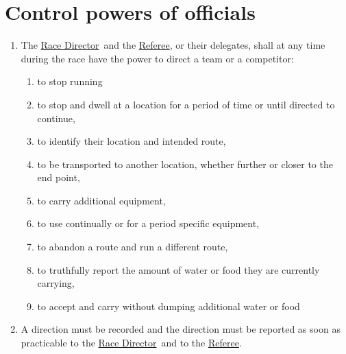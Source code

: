 \documentclass[12pt]{report}
\newcommand{\hyplink}[1]{\hyperlink{#1}{{#1}}}
\newcommand{\RaceDirector}{\hyplink{Race Director}}
\newcommand{\Referee}{\hyplink{Referee}}
\begin{document}
    \section{Control powers of officials}
  \begin{enumerate}
    \item The \RaceDirector\  and the \Referee, or their delegates, shall at any time during the race have the power to direct a team or a competitor:
    \begin{enumerate}
      \item to stop running
      \item to stop and dwell at a location for a period of time or until directed to continue,
      \item to identify their location and intended route,
      \item to be transported to another location, whether further or closer to the end point,
      \item to carry additional equipment,
      \item to use continually or for a period specific equipment,
      \item to abandon a route and run a different route,
      \item to truthfully report the amount of water or food they are currently carrying,
      \item to accept and carry without dumping additional water or food
    \end{enumerate}
    \item A direction must be recorded and the direction must be reported as soon as practicable to the  \RaceDirector\ and to the \Referee.
  \end{enumerate}
\end{document}
